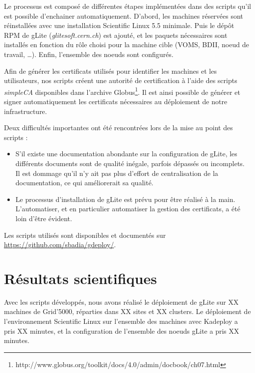 \documentclass[a4paper,11pt]{article}
\begin{document}
Le processus est composé de différentes étapes implémentées dans des
scripts qu'il est possible d'enchainer automatiquement.  D'abord, les machines
réservées sont réinstallées avec une installation Scientific Linux 5.5
minimale. Puis le dépôt RPM de gLite (\textsl{glitesoft.cern.ch}) est ajouté,
et les paquets nécessaires sont installés en fonction du rôle choisi pour la
machine cible (VOMS, BDII, noeud de travail, \ldots). Enfin, l'ensemble des
noeuds sont configurés.

Afin de générer les certificats utilisés pour identifier les machines et les
utilisateurs, nos scripts créent une autorité de certification à l'aide des
scripts \textsl{simpleCA} disponibles dans l'archive
Globus\footnote{http://www.globus.org/toolkit/docs/4.0/admin/docbook/ch07.html}.
Il est ainsi possible de générer et signer automatiquement les certificats
nécessaires au déploiement de notre infrastructure.

Deux difficultés importantes ont été rencontrées lors de la mise au point des scripts :

\begin{itemize}

\item S'il existe une documentation abondante sur la configuration de gLite,
	les différents documents sont de qualité inégale, parfois dépassés ou
	incomplets. Il est dommage qu'il n'y ait pas  plus d'effort de
	centralisation de la documentation, ce qui améliorerait sa qualité.

\item Le processus d'installation de gLite est prévu pour être réalisé à la
	main. L'automatiser, et en particulier automatiser la gestion des
	certificats, a été loin d'être évident.

\end{itemize}

Les scripts utilisés sont disponibles et documentés sur \url{https://github.com/sbadia/gdeploy/}.

\section{Résultats scientifiques}

Avec les scripts développés, nous avons réalisé le déploiement de gLite sur XX
machines de Grid'5000, réparties dans XX sites et XX clusters. Le déploiement
de l'environnement Scientific Linux sur l'ensemble des machines avec Kadeploy a
pris XX minutes, et la configuration de l'ensemble des noeuds gLite a pris XX
minutes.
\end{document}
